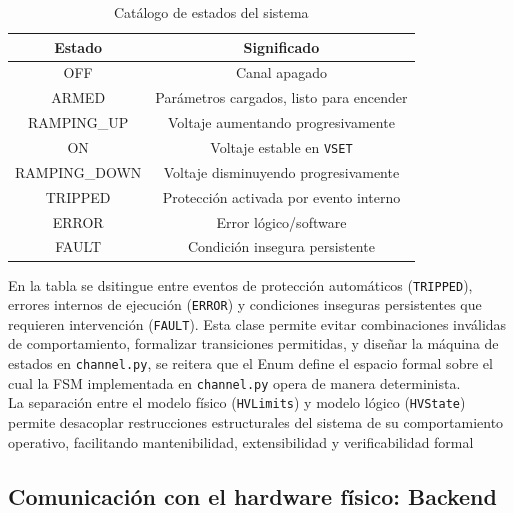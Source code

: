 \documentclass{article}
\begin{document}
\begin{table}[h]
    \centering
    \begin{tabular}{|c|c|}
        \hline
        Estado & Significado \\ 
        \hline
        OFF & Canal apagado \\ 
        ARMED & Parámetros cargados, listo para encender\\
        RAMPING\_UP & Voltaje aumentando progresivamente\\
        ON & Voltaje estable en \texttt{VSET}\\
        RAMPING\_DOWN & Voltaje disminuyendo progresivamente\\
        TRIPPED & Protección activada por evento interno\\
        ERROR & Error lógico/software\\
        FAULT  & Condición insegura persistente\\
        \hline
    \end{tabular}
    \caption{Catálogo de estados del sistema}
    \label{tab:Estados del sistema}
\end{table}
En la tabla se dsitingue entre eventos de protección automáticos (\texttt{TRIPPED}), errores internos de ejecución (\texttt{ERROR}) y condiciones inseguras persistentes que requieren intervención (\texttt{FAULT}).
Esta clase permite evitar combinaciones inválidas de comportamiento, formalizar transiciones permitidas, y diseñar la máquina de estados en \texttt{channel.py}, se reitera que el Enum define el espacio formal sobre el cual la FSM implementada en \texttt{channel.py} opera de manera determinista.\\

La separación entre el modelo físico (\texttt{HVLimits}) y modelo lógico (\texttt{HVState}) permite desacoplar restrucciones estructurales del sistema de su comportamiento operativo, facilitando mantenibilidad, extensibilidad y verificabilidad formal


\subsection{Comunicación con el hardware físico: Backend}
\end{document}
